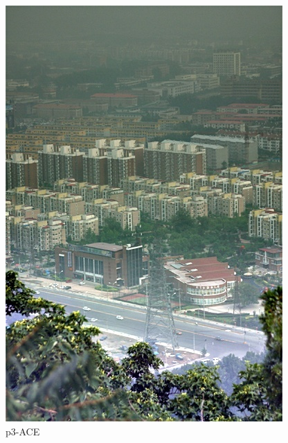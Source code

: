 \documentclass[12pt]{article}
\begin{document}
\begin{figure}[!h]
\begin{minipage}[t]{0.24\linewidth}
        \includegraphics[width=0.9\linewidth]{sample_pictures/after_p3_ACE.jpg}
        \caption*{p3-ACE}
    \end{minipage}\begin{minipage}[t]{0.24\linewidth}
        \centering

\end{minipage}
\end{figure}
\end{document}
